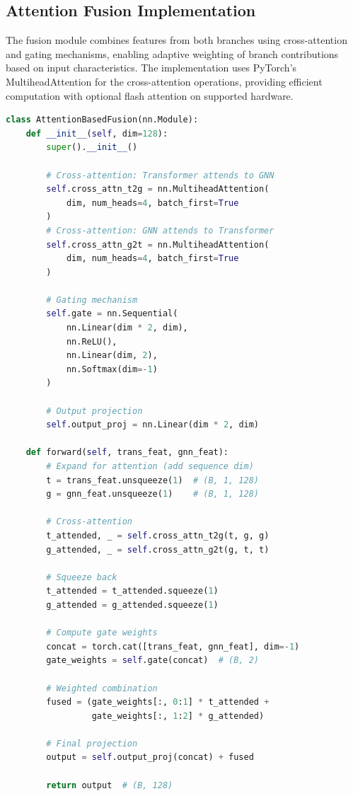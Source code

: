 \subsection{Attention Fusion Implementation}

The fusion module combines features from both branches using cross-attention and gating mechanisms, enabling adaptive weighting of branch contributions based on input characteristics. The implementation uses PyTorch's MultiheadAttention for the cross-attention operations, providing efficient computation with optional flash attention on supported hardware.

\begin{lstlisting}[language=Python, caption={Attention Fusion Mechanism (attention\_fusion.py)}]
class AttentionBasedFusion(nn.Module):
    def __init__(self, dim=128):
        super().__init__()

        # Cross-attention: Transformer attends to GNN
        self.cross_attn_t2g = nn.MultiheadAttention(
            dim, num_heads=4, batch_first=True
        )
        # Cross-attention: GNN attends to Transformer
        self.cross_attn_g2t = nn.MultiheadAttention(
            dim, num_heads=4, batch_first=True
        )

        # Gating mechanism
        self.gate = nn.Sequential(
            nn.Linear(dim * 2, dim),
            nn.ReLU(),
            nn.Linear(dim, 2),
            nn.Softmax(dim=-1)
        )

        # Output projection
        self.output_proj = nn.Linear(dim * 2, dim)

    def forward(self, trans_feat, gnn_feat):
        # Expand for attention (add sequence dim)
        t = trans_feat.unsqueeze(1)  # (B, 1, 128)
        g = gnn_feat.unsqueeze(1)    # (B, 1, 128)

        # Cross-attention
        t_attended, _ = self.cross_attn_t2g(t, g, g)
        g_attended, _ = self.cross_attn_g2t(g, t, t)

        # Squeeze back
        t_attended = t_attended.squeeze(1)
        g_attended = g_attended.squeeze(1)

        # Compute gate weights
        concat = torch.cat([trans_feat, gnn_feat], dim=-1)
        gate_weights = self.gate(concat)  # (B, 2)

        # Weighted combination
        fused = (gate_weights[:, 0:1] * t_attended +
                 gate_weights[:, 1:2] * g_attended)

        # Final projection
        output = self.output_proj(concat) + fused

        return output  # (B, 128)
\end{lstlisting}

